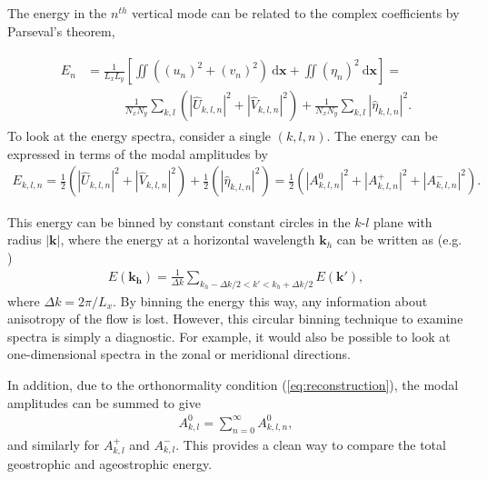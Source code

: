 The energy in the $n^{th}$ vertical mode can be related to the complex coefficients by Parseval's theorem,

\begin{align}
\begin{split}
E_n &= \frac{1}{L_x L_y} \left[ \iint ( (u_n)^2 + (v_n)^2) ~\text{d}\mathbf{x}  + \iint (\eta_n)^2 ~\text{d}\mathbf{x} \right]  = \\
&\quad\quad\quad \frac{1}{N_x N_y} \sum_{k,l} (|\widehat{U}_{k,l,n}|^2 + |\widehat{V}_{k,l,n}|^2) + \frac{1}{N_x N_y} \sum_{k,l} |\widehat{\eta}_{k,l,n}|^2.
\end{split}
\end{align}
To look at the energy spectra, consider a single $(k,l,n)$. The energy can be expressed in terms of the modal amplitudes by
\begin{align}
E_{k,l,n} = \frac{1}{2} \left( |\widehat{U}_{k,l,n}|^2 + |\widehat{V}_{k,l,n}|^2 \right) + \frac{1}{2} \left(|\widehat{\eta}_{k,l,n}|^2 \right) = \frac{1}{2} \left( |A^0_{k,l,n}|^2 + |A^+_{k,l,n}|^2 + |A^-_{k,l,n}|^2 \right).
\end{align}

This energy can be binned by constant  constant circles in the $k$-$l$ plane with radius $|\mathbf{k}|$, where the energy at a horizontal wavelength $\mathbf{k}_h$ can be written as (e.g. \cite{Waite2004})
\begin{align}
E(\mathbf{k_h}) = \frac{1}{\Delta k} \sum_{k_h - \Delta k/2 < k' < k_h + \Delta k/2} E(\mathbf{k'}), \label{eq:binning}
\end{align}
where $\Delta k = 2\pi/L_x$. By binning the energy this way, any information about anisotropy of the flow is lost. However, this circular binning technique to examine spectra is simply a diagnostic. For example, it would also be possible to look at one-dimensional spectra in the zonal or meridional directions.

In addition, due to the orthonormality condition (\ref{eq:reconstruction}), the modal amplitudes can be summed to give
\begin{align}
A^0_{k,l} = \sum_{n=0}^\infty A^0_{k,l,n},
\end{align}
and similarly for $A^+_{k,l}$ and $A^-_{k,l}$. This provides a clean way to compare the total geostrophic and ageostrophic energy.
